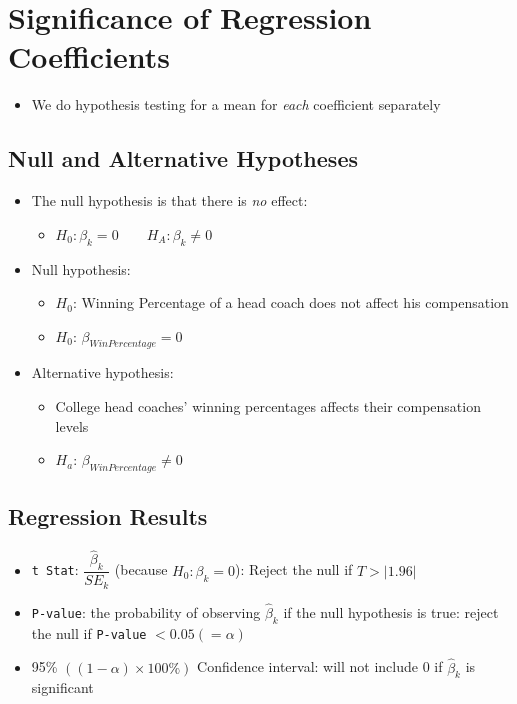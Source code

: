 \documentclass[10pt,article]{article}
\begin{document}
\section{Significance of Regression Coefficients}
\label{sec:orgc1db947}
\begin{itemize}
\item We do hypothesis testing for a mean for \emph{each} coefficient separately
\end{itemize}
\subsection{Null and Alternative Hypotheses}
\label{sec:org7b29ae8}
\begin{itemize}
\item The null hypothesis is that there is \emph{no} effect:
\begin{itemize}
\item \(H_{0}: \beta_{k}=0 \qquad H_{A}: \beta_k \ne 0\)
\end{itemize}
\end{itemize}

\begin{itemize}
\item Null hypothesis:
\begin{itemize}
\item \(H_0\): Winning Percentage of a head coach does not affect his
compensation
\item \(H_0\): \(\beta_{WinPercentage} = 0\)
\end{itemize}

\item Alternative hypothesis: 
\begin{itemize}
\item College head coaches' winning percentages affects their compensation levels
\item \(H_{a}\): \(\beta_{WinPercentage} \ne 0\)
\end{itemize}
\end{itemize}

\subsection{Regression Results}
\label{sec:orgb10e432}
\begin{itemize}
\item \texttt{t Stat}: \(\dfrac{\hat{\beta}_{k}}{SE_{k}}\) (because \(H_0: \beta_k=0\)): Reject the null if \(T > |1.96|\)
\end{itemize}

\begin{itemize}
\item \texttt{P-value}: the probability of observing \(\hat{\beta}_{k}\) if the null
hypothesis is true: reject the null if \texttt{P-value} \(< 0.05 (=\alpha)\)
\end{itemize}

\begin{itemize}
\item 95\% \(((1-\alpha) \times 100 \%)\) Confidence interval: will not include
0 if \(\hat{\beta}_{k}\) is significant
\end{itemize}
\end{document}
